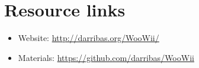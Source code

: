\documentclass[11pt, a4paper]{article}
\begin{document}
\section{Resource links}
\label{sec-3}

\begin{itemize}
\item Website: \href{http://darribas.org/WooWii/}{http://darribas.org/WooWii/}
\item Materials: \href{https://github.com/darribas/WooWii}{https://github.com/darribas/WooWii}
\end{itemize}

%


\end{document}
